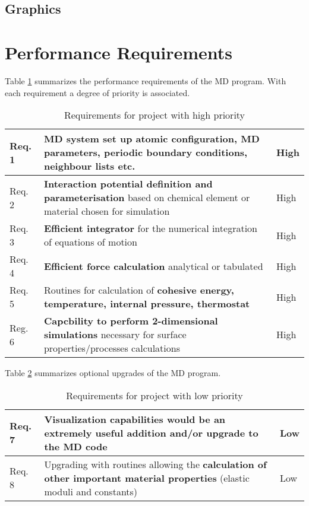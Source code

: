 \documentclass[12pt,a4paper]{article}
\begin{document}
\subsection{Graphics}

\newpage
\section{Performance Requirements}
Table \ref{tab:Requirements} summarizes the performance requirements of the MD program. With each requirement a degree of priority is associated.

\begin{table}[h]
\caption{Requirements for project with high priority}
\begin{tabular}{| p{} | p{} | p{} |}
	\hline
	Req. 1 & \textbf{MD system set up} atomic configuration, MD parameters, periodic boundary conditions,  neighbour lists etc. & High \\
	\hline
	Req. 2 & \textbf{Interaction potential definition and parameterisation} based on chemical element or material chosen for simulation & High \\
	\hline
	Req. 3 & \textbf{Efficient integrator} for the numerical integration of equations of motion & High \\
	\hline
	Req. 4 & \textbf{Efficient force calculation} analytical or tabulated & High \\
	\hline
	Req. 5 & Routines for calculation of  \textbf{cohesive energy, temperature, internal pressure, thermostat} & High \\
	\hline
	Reg. 6 & \textbf{Capcbility to perform 2-dimensional simulations} necessary for surface properties/processes calculations & High \\
	\hline 
\end{tabular}
\label{tab:Requirements}
\end{table}

Table \ref{tab:OptionalReq} summarizes optional upgrades of the MD program.

\begin{table}[h]
\caption{Requirements for project with low priority}
\begin{tabular}{| p{} | p{} | p{} |}
	\hline
	Req. 7 & \textbf{Visualization capabilities} would be an extremely useful addition and/or upgrade to the MD code & Low \\
	\hline
	Req. 8 & Upgrading with routines allowing the \textbf{calculation of other important material properties} (elastic moduli and constants) & Low \\
	\hline
\end{tabular}
\label{tab:OptionalReq}
\end{table}
\end{document}
